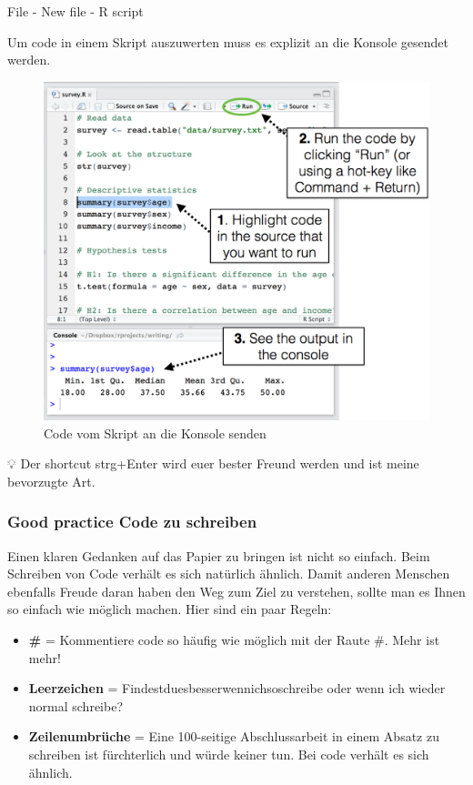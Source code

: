 \documentclass[
]{article}
\providecommand{\tightlist}{%
  \setlength{\itemsep}{0pt}\setlength{\parskip}{0pt}}
\begin{document}
File - New file - R script

Um code in einem Skript auszuwerten muss es explizit an die Konsole gesendet werden.

\begin{figure}

{\centering \includegraphics[width=12.14in]{images/014} 

}

\caption{Code vom Skript an die Konsole senden}\label{fig:unnamed-chunk-21}
\end{figure}

💡 Der shortcut strg+Enter wird euer bester Freund werden und ist meine bevorzugte Art.

\hypertarget{good-practice-code-zu-schreiben}{%
\subsubsection{Good practice Code zu schreiben}\label{good-practice-code-zu-schreiben}}

Einen klaren Gedanken auf das Papier zu bringen ist nicht so einfach. Beim Schreiben von Code verhält es sich natürlich ähnlich. Damit anderen Menschen ebenfalls Freude daran haben den Weg zum Ziel zu verstehen, sollte man es Ihnen so einfach wie möglich machen. Hier sind ein paar Regeln:

\begin{itemize}
\tightlist
\item
  \textbf{\#} = Kommentiere code so häufig wie möglich mit der Raute \#. Mehr ist mehr!
\item
  \textbf{Leerzeichen} = Findestduesbesserwennichsoschreibe oder wenn ich wieder normal schreibe?
\item
  \textbf{Zeilenumbrüche} = Eine 100-seitige Abschlussarbeit in einem Absatz zu schreiben ist fürchterlich und würde keiner tun. Bei code verhält es sich ähnlich.
\end{itemize}
\end{document}
